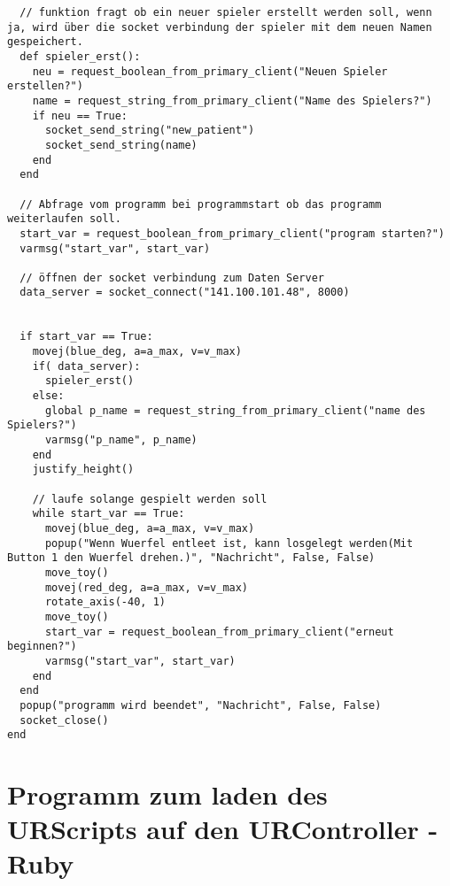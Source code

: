 \documentclass[
a4paper,
12pt,
oneside,
headsepline,		%
footsepline,		%
]{scrbook}
\begin{document}
\begin{lstlisting}
  // funktion fragt ob ein neuer spieler erstellt werden soll, wenn ja, wird über die socket verbindung der spieler mit dem neuen Namen gespeichert.
  def spieler_erst():
    neu = request_boolean_from_primary_client("Neuen Spieler erstellen?")
    name = request_string_from_primary_client("Name des Spielers?")
    if neu == True:
      socket_send_string("new_patient")
      socket_send_string(name)
    end
  end

  // Abfrage vom programm bei programmstart ob das programm weiterlaufen soll.
  start_var = request_boolean_from_primary_client("program starten?")
  varmsg("start_var", start_var)

  // öffnen der socket verbindung zum Daten Server
  data_server = socket_connect("141.100.101.48", 8000)
  
  
  if start_var == True:
    movej(blue_deg, a=a_max, v=v_max)
    if( data_server):
      spieler_erst()
    else:
      global p_name = request_string_from_primary_client("name des Spielers?")
      varmsg("p_name", p_name)
    end
    justify_height()

    // laufe solange gespielt werden soll
    while start_var == True:
      movej(blue_deg, a=a_max, v=v_max)
      popup("Wenn Wuerfel entleet ist, kann losgelegt werden(Mit Button 1 den Wuerfel drehen.)", "Nachricht", False, False)
      move_toy()
      movej(red_deg, a=a_max, v=v_max)
      rotate_axis(-40, 1)
      move_toy()
      start_var = request_boolean_from_primary_client("erneut beginnen?")
      varmsg("start_var", start_var)
    end
  end
  popup("programm wird beendet", "Nachricht", False, False)
  socket_close()
end
\end{lstlisting}

\chapter{Programm zum laden des URScripts auf den URController - Ruby}
\end{document}
